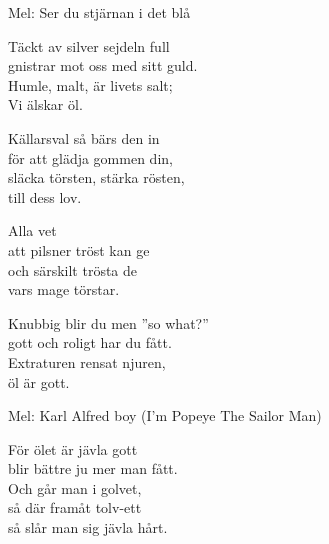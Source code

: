 \begin{SongText}[Vi älskar öl]
    \begin{SongInfo}
        Mel: Ser du stjärnan i det blå
    \end{SongInfo}
    \begin{SongVerse}
        Täckt av silver sejdeln full\\%
        gnistrar mot oss med sitt guld.\\%
        Humle, malt, är livets salt;\\%
        Vi älskar öl.
    \end{SongVerse}
    \begin{SongVerse}
        Källarsval så bärs den in\\%
        för att glädja gommen din,\\%
        släcka törsten, stärka rösten,\\%
        till dess lov.
    \end{SongVerse}
    \begin{SongVerse}
        Alla vet\\%
        att pilsner tröst kan ge\\%
        och särskilt trösta de\\%
        vars mage törstar.
    \end{SongVerse}
    \begin{SongVerse}
        Knubbig blir du men ”so what?”\\%
        gott och roligt har du fått.\\%
        Extraturen rensat njuren,\\%
        öl är gott.
    \end{SongVerse}
\end{SongText}
\begin{SongText}
    \begin{SongInfo}
        Mel: Karl Alfred boy (I'm Popeye The Sailor Man)
    \end{SongInfo}
    \begin{SongVerse}
        För ölet är jävla gott\\%
        blir bättre ju mer man fått.\\%
        Och går man i golvet,\\%
        så där framåt tolv-ett\\%
        så slår man sig jävla hårt.
    \end{SongVerse}
\end{SongText}
